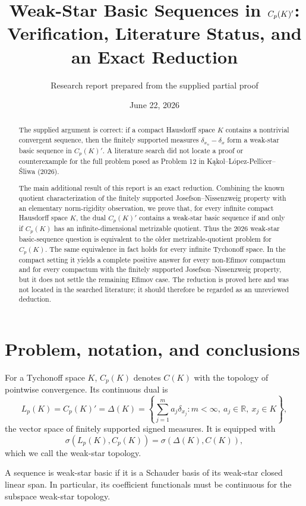 \documentclass[11pt]{article}
\title{Weak-Star Basic Sequences in $\Cp(K)'$: \\
Verification, Literature Status, and an Exact Reduction}
\author{Research report prepared from the supplied partial proof}
\date{June 22, 2026}
\newcommand{\Cp}{C_p}
\newcommand{\Lp}{L_p}
\newcommand{\R}{\mathbb{R}}
\begin{document}
\maketitle

\begin{abstract}
The supplied argument is correct: if a compact Hausdorff space $K$ contains a
nontrivial convergent sequence, then the finitely supported measures
$\delta_{x_n}-\delta_x$ form a weak-star basic sequence in $\Cp(K)'$.  A
literature search did not locate a proof or counterexample for the full problem
posed as Problem 12 in K\k{a}kol--L\'opez-Pellicer--\'Sliwa (2026).

The main additional result of this report is an exact reduction.  Combining
the known quotient characterization of the finitely supported
Josefson--Nissenzweig property with an elementary norm-rigidity observation, we
prove that, for every infinite compact Hausdorff space $K$, the dual
$\Cp(K)'$ contains a weak-star basic sequence if and only if $\Cp(K)$ has an
infinite-dimensional metrizable quotient.  Thus the 2026 weak-star
basic-sequence question is equivalent to the older metrizable-quotient problem
for $\Cp(K)$.  The same equivalence in fact holds for every infinite
Tychonoff space.  In the compact setting it yields a complete positive answer
for every non-Efimov compactum and for every compactum with the finitely supported
Josefson--Nissenzweig property, but it does not settle the remaining Efimov
case.  The reduction is proved here and was not located in the searched
literature; it should therefore be regarded as an unreviewed deduction.
\end{abstract}

\section{Problem, notation, and conclusions}

For a Tychonoff space $K$, $\Cp(K)$ denotes $C(K)$ with the topology of
pointwise convergence.  Its continuous dual is
\[
 \Lp(K)=\Cp(K)'=\Delta(K)
 =\left\{\sum_{j=1}^m a_j\delta_{x_j}:m<\infty,\ a_j\in\R,\ x_j\in K\right\},
\]
the vector space of finitely supported signed measures.  It is equipped with
\[
 \sigma(\Lp(K),\Cp(K))=\sigma(\Delta(K),C(K)),
\]
which we call the weak-star topology.

A sequence is weak-star basic if it is a Schauder basis of its weak-star closed
linear span.  In particular, its coefficient functionals must be continuous
for the subspace weak-star topology.
\end{document}
